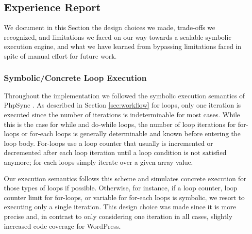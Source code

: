 \documentclass[sigconf]{acmart}
\renewcommand{\sf}[1]{\textsf{#1}}
\begin{document}
\subsection{Experience Report}\label{sec:experience_report}
We document in this Section the design choices we made, trade-offs we
recognized, and limitations we faced on our way towards a scalable symbolic
execution engine, and what we have learned from bypassing limitations faced in
spite of manual effort for future work.

\subsubsection{Symbolic/Concrete Loop Execution}
Throughout the implementation we followed the symbolic execution
semantics of \sf{PhpSync} \cite{Nguyen:2014:BCG:2635868.2635928}. As described
in Section \ref{sec:workflow} for loops, only one iteration is executed since
the number of iterations is indeterminable for most cases. While this is the
case for while and do-while loops, the number of loop iterations for for-loops
or for-each loops is generally determinable and known before entering the loop
body. For-loops use a loop counter that usually is incremented or decremented
after each loop iteration until a loop condition is not satisfied anymore;
for-each loops simply iterate over a given array value.

Our execution semantics follows this scheme and simulates concrete execution
for those types of loops if possible. Otherwise, for instance, if a loop
counter, loop counter limit for for-loops, or variable for for-each loops is
symbolic, we resort to executing only a single iteration. This design choice
was made since it is more precise and, in contrast to only considering one
iteration in all cases, slightly increased code coverage for \sf{WordPress}.
\end{document}

